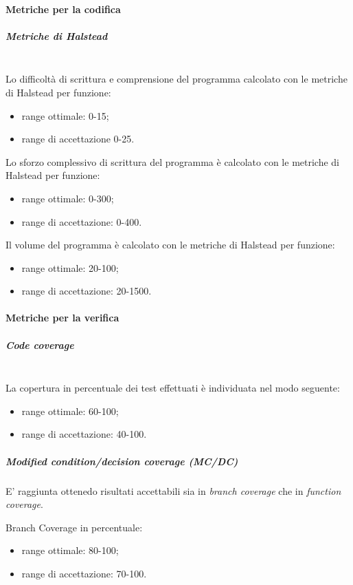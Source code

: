 \paragraph{Metriche per la codifica}\mbox{}
\subparagraph{Metriche di Halstead}\mbox{}\\

Lo difficoltà di scrittura e comprensione del programma calcolato con le metriche di Halstead per funzione:
\begin{itemize}
	\item range ottimale: 0-15;
	\item range di accettazione 0-25.
\end{itemize}

Lo sforzo complessivo di scrittura del programma è calcolato con le metriche di Halstead per funzione:
\begin{itemize}
	\item range ottimale: 0-300;
	\item range di accettazione: 0-400.
\end{itemize}

Il volume del programma è calcolato con le metriche di Halstead per funzione:
\begin{itemize}
	\item range ottimale: 20-100;
	\item range di accettazione: 20-1500.
\end{itemize}

\paragraph{Metriche per la verifica}\mbox{}
\subparagraph{Code coverage}\mbox{}\\
La copertura in percentuale dei test effettuati è individuata nel modo seguente:
\begin{itemize}
	\item range ottimale: 60-100;
	\item range di accettazione: 40-100.
\end{itemize}

\subparagraph{Modified condition/decision coverage (MC/DC)}
E' raggiunta ottenedo risultati accettabili sia in \textit{branch coverage} che in \textit{function coverage}.

Branch Coverage in percentuale:
\begin{itemize}
	\item range ottimale: 80-100;
	\item range di accettazione: 70-100.
\end{itemize}

